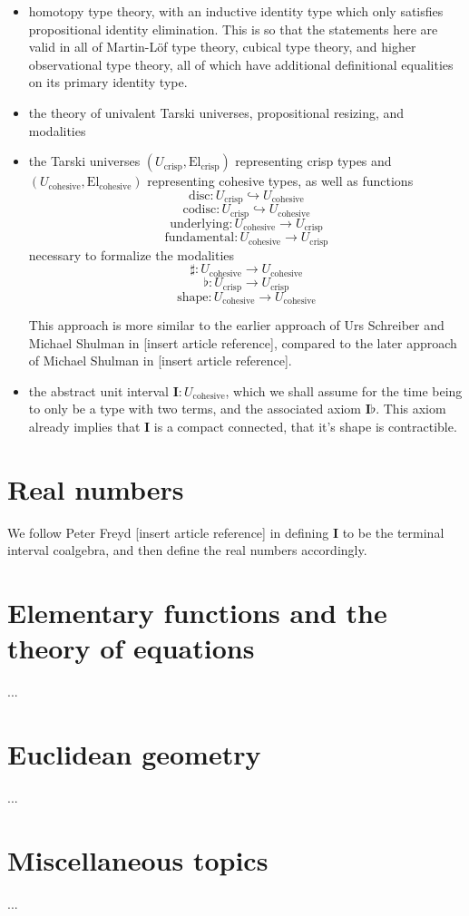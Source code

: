\documentclass[one]{article}
\begin{document}
\begin{itemize}
\item homotopy type theory, with an inductive identity type which only satisfies propositional identity elimination. This is so that the statements here are valid in all of Martin-Löf type theory, cubical type theory, and higher observational type theory, all of which have additional definitional equalities on its primary identity type. 

\item the theory of univalent Tarski universes, propositional resizing, and modalities

\item the Tarski universes $(U_\mathrm{crisp}, \mathrm{El}_\mathrm{crisp})$ representing crisp types and $(U_\mathrm{cohesive}, \mathrm{El}_\mathrm{cohesive})$ representing cohesive types, as well as functions 
$$\mathrm{disc}:U_\mathrm{crisp} \hookrightarrow U_\mathrm{cohesive}$$ 
$$\mathrm{codisc}:U_\mathrm{crisp} \hookrightarrow U_\mathrm{cohesive}$$
$$\mathrm{underlying}:U_\mathrm{cohesive} \to U_\mathrm{crisp}$$ 
$$\mathrm{fundamental}:U_\mathrm{cohesive} \to U_\mathrm{crisp}$$ 
necessary to formalize the modalities 
$$\sharp:U_\mathrm{cohesive} \to U_\mathrm{cohesive}$$
$$\flat:U_\mathrm{crisp} \to U_\mathrm{crisp}$$
$$\mathrm{shape}:U_\mathrm{cohesive} \to U_\mathrm{cohesive}$$

This approach is more similar to the earlier approach of Urs Schreiber and Michael Shulman in [insert article reference], compared to the later approach of Michael Shulman in [insert article reference]. 

\item the abstract unit interval $\mathbf{I}:U_\mathrm{cohesive}$, which we shall assume for the time being to only be a type with two terms, and the associated axiom $\mathbf{I} \flat$. This axiom already implies that $\mathbf{I}$ is a compact connected, that it's shape is contractible. 

\end{itemize}

\section{Real numbers}

We follow Peter Freyd [insert article reference] in defining $\mathbf{I}$ to be the terminal interval coalgebra, and then define the real numbers accordingly. 

\section{Elementary functions and the theory of equations}

...

\section{Euclidean geometry}

...

\section{Miscellaneous topics}

...
\end{document}
